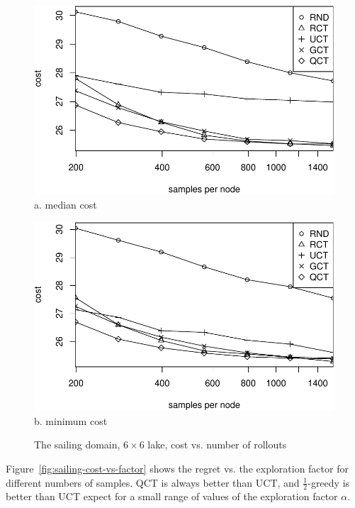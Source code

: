 \documentclass[letterpaper]{article}
\begin{document}
\begin{figure}[h!]
  \begin{minipage}[b]{1.0\linewidth}
    \centering
    \includegraphics[scale=0.45]{costs-size=6-group=median.pdf}\\
    a. median cost
    \vspace{1em}
  \end{minipage}
  \begin{minipage}[b]{1.0\linewidth}
    \centering
    \includegraphics[scale=0.45]{costs-size=6-group=minimum.pdf}\\
    b. minimum cost
  \end{minipage}
  \caption{The sailing domain, $6\times 6$ lake, cost vs. number of rollouts}
  \label{fig:sailing-cost-vs-nsamples}
\end{figure}

Figure~\ref{fig:sailing-cost-vs-factor} shows the regret vs. the
exploration factor for different numbers of samples. QCT is always better than
UCT, and $\frac 1 2$-greedy is better than UCT expect for a small range of
values of the exploration factor $\alpha$. 
\end{document}
